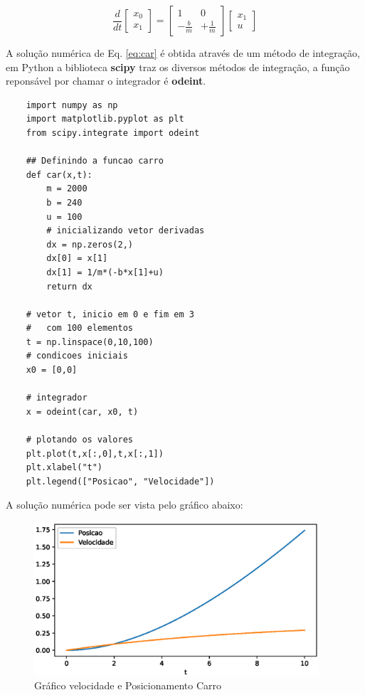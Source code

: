 \begin{equation}\label{eq:car}
    \frac{d}{dt}\begin{bmatrix} x_0 \\ x_1 \end{bmatrix} = 
    \begin{bmatrix} 1 & 0\\ -\displaystyle\frac{b}{m} & +\displaystyle\frac{1}{m} \end{bmatrix}
    \begin{bmatrix} x_1 \\ u \end{bmatrix}    
\end{equation}

A solução numérica de Eq. \ref{eq:car} é obtida através de um método de integração, em Python a biblioteca \textbf{scipy} traz
os diversos métodos de integração, a função reponsável por chamar o integrador é \textbf{odeint}.

\begin{lstlisting}
    import numpy as np
    import matplotlib.pyplot as plt
    from scipy.integrate import odeint

    ## Definindo a funcao carro
    def car(x,t):
        m = 2000
        b = 240
        u = 100
        # inicializando vetor derivadas
        dx = np.zeros(2,)
        dx[0] = x[1]
        dx[1] = 1/m*(-b*x[1]+u)
        return dx

    # vetor t, inicio em 0 e fim em 3
    #   com 100 elementos
    t = np.linspace(0,10,100)
    # condicoes iniciais
    x0 = [0,0]

    # integrador
    x = odeint(car, x0, t)

    # plotando os valores
    plt.plot(t,x[:,0],t,x[:,1])
    plt.xlabel("t")
    plt.legend(["Posicao", "Velocidade"]) 
\end{lstlisting}
 
A solução numérica pode ser vista pelo gráfico abaixo:

\begin{figure}[htb]
    \includegraphics[width=300pt]{chapters/chapter0/figures/exercice_car.eps}
    \caption[Modelo Dinâmico Carro]{Gráfico velocidade e Posicionamento Carro}
\end{figure}


